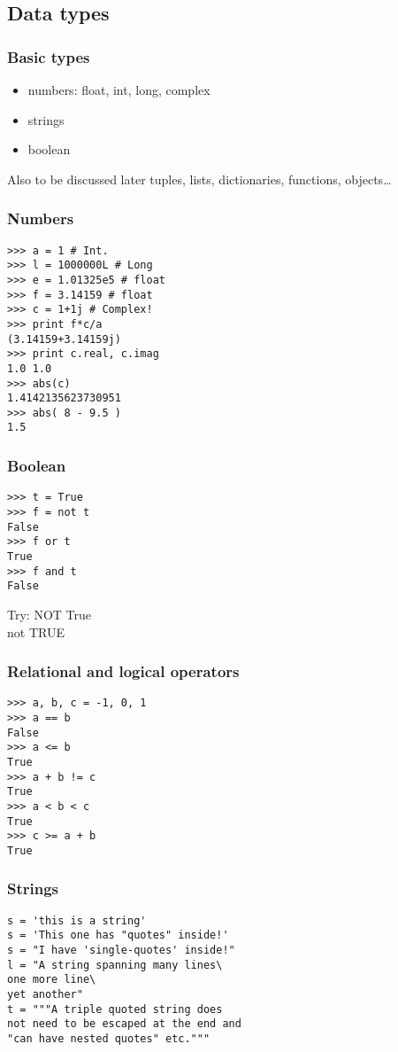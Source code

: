 \documentclass[14pt,compress]{beamer}
\begin{document}
\subsection{Data types}
\begin{frame}
  \frametitle{Basic types}
  \begin{itemize}
    \item numbers: float, int, long, complex
    \item strings
    \item boolean
  \end{itemize}
  \begin{block}{Also to be discussed later}
    tuples, lists, dictionaries, functions, objects\ldots
  \end{block}
\end{frame}

\begin{frame}[fragile]
  \frametitle{Numbers}
  \vspace*{-0.25in}
  \begin{lstlisting}
>>> a = 1 # Int.
>>> l = 1000000L # Long
>>> e = 1.01325e5 # float
>>> f = 3.14159 # float
>>> c = 1+1j # Complex!
>>> print f*c/a
(3.14159+3.14159j)
>>> print c.real, c.imag
1.0 1.0
>>> abs(c)
1.4142135623730951
>>> abs( 8 - 9.5 )
1.5
  \end{lstlisting}
\end{frame}

\begin{frame}[fragile]
  \frametitle{Boolean}
  \begin{lstlisting}
>>> t = True
>>> f = not t
False
>>> f or t
True
>>> f and t
False
  \end{lstlisting}
  \begin{block}{Try:}
  NOT True\\
  not TRUE
  \end{block}
\end{frame}

\begin{frame}[fragile]
  \frametitle{Relational and logical operators}
  \begin{lstlisting}
>>> a, b, c = -1, 0, 1
>>> a == b
False
>>> a <= b 
True
>>> a + b != c
True
>>> a < b < c
True
>>> c >= a + b
True
  \end{lstlisting}
\end{frame}

\begin{frame}[fragile]
  \frametitle{Strings}
  \begin{lstlisting}
s = 'this is a string'
s = 'This one has "quotes" inside!'
s = "I have 'single-quotes' inside!"
l = "A string spanning many lines\
one more line\
yet another"
t = """A triple quoted string does
not need to be escaped at the end and 
"can have nested quotes" etc."""
  \end{lstlisting}
\end{frame}
\end{document}
